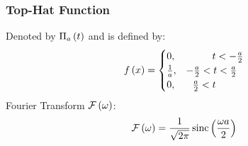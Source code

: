 \subsubsection{Top-Hat Function}
Denoted by $\Pi_a\left(t\right)$ and is defined by:
\begin{equation}
    f\left(x\right)=
    \begin{cases}
        0, & \ \ \ \ \ \ \ \ t < -\frac{a}{2} \\
        \frac{1}{a}, & -\frac{a}{2} < t < \frac{a}{2}\\
        0, & \ \  \frac{a}{2} < t
    \end{cases}
\end{equation}
\noindent Fourier Transform $\mathcal{F}\left(\omega\right)$:
\begin{equation}
    \mathcal{F}\left(\omega\right)=\frac{1}{\sqrt{2\pi}}\operatorname{sinc}\left(\frac{\omega a}{2}\right)
\end{equation}

